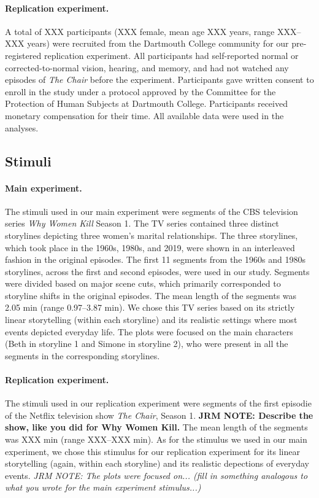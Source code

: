 \documentclass[10pt]{article}
\begin{document}
\paragraph*{Replication experiment.} A total of XXX participants (XXX female,
mean age XXX years, range XXX--XXX years) were recruited from the Dartmouth
College community for our pre-registered replication experiment. All
participants had self-reported normal or corrected-to-normal vision, hearing,
and memory, and had not watched any episodes of \textit{The Chair} before the
experiment. Participants gave written consent to enroll in the study under a
protocol approved by the Committee for the Protection of Human Subjects at
Dartmouth College. Participants received monetary compensation for their time.
All available data were used in the analyses.

\subsection*{Stimuli}

\paragraph{Main experiment.}
The stimuli used in our main experiment were segments of the CBS television series
\textit{Why Women Kill} Season 1. The TV series contained three distinct
storylines depicting three women’s marital relationships. The three storylines,
which took place in the 1960s, 1980s, and 2019, were shown in an interleaved
fashion in the original episodes. The first 11 segments from the 1960s and
1980s storylines, across the first and second episodes, were used in our study.
Segments were divided based on major scene cuts, which primarily corresponded
to storyline shifts in the original episodes. The mean length of the segments
was 2.05 min (range 0.97--3.87 min). We chose this TV series based on its
strictly linear storytelling (within each storyline) and its realistic settings
where most events depicted everyday life. The plots were focused on the main
characters (Beth in storyline 1 and Simone in storyline 2), who were present in
all the segments in the corresponding storylines.

\paragraph{Replication experiment.} The stimuli used in our replication
experiment were segments of the first episodie of the Netflix television show
\textit{The Chair}, Season 1. \textbf{JRM NOTE: Describe the show, like you did
for Why Women Kill.} The mean length of the segments was XXX min (range
XXX--XXX min). As for the stimulus we used in our main experiment, we chose
this stimulus for our replication experiment for its linear storytelling
(again, within each storyline) and its realistic depections of everyday events.
\textit{JRM NOTE: The plots were focused on... (fill in something analogous to
what you wrote for the main experiment stimulus...)}
\end{document}
